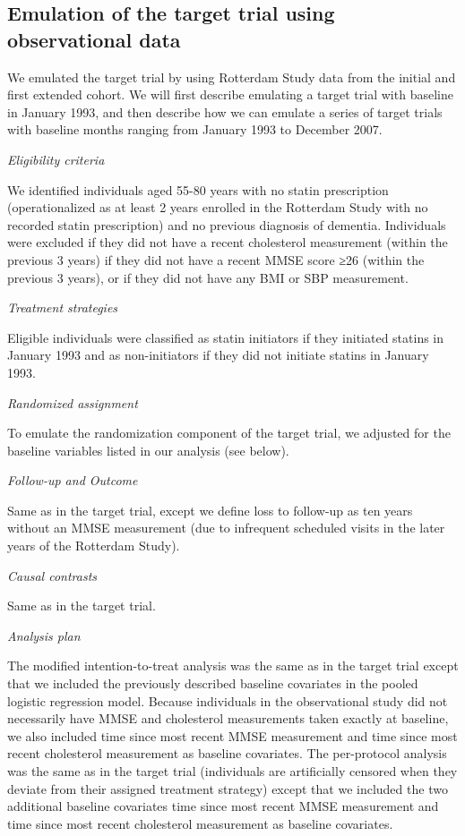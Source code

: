 \documentclass[
]{book}
\begin{document}
\hypertarget{emulation-of-the-target-trial-using-observational-data}{%
\subsection{Emulation of the target trial using observational data}\label{emulation-of-the-target-trial-using-observational-data}}

We emulated the target trial by using Rotterdam Study data from the initial and first extended cohort. We will first describe emulating a target trial with baseline in January 1993, and then describe how we can emulate a series of target trials with baseline months ranging from January 1993 to December 2007.

\emph{Eligibility criteria}

We identified individuals aged 55-80 years with no statin prescription (operationalized as at least 2 years enrolled in the Rotterdam Study with no recorded statin prescription) and no previous diagnosis of dementia. Individuals were excluded if they did not have a recent cholesterol measurement (within the previous 3 years) if they did not have a recent MMSE score ≥26 (within the previous 3 years), or if they did not have any BMI or SBP measurement.

\emph{Treatment strategies}

Eligible individuals were classified as statin initiators if they initiated statins in January 1993 and as non-initiators if they did not initiate statins in January 1993.

\emph{Randomized assignment}

To emulate the randomization component of the target trial, we adjusted for the baseline variables listed in our analysis (see below).

\emph{Follow-up and Outcome}

Same as in the target trial, except we define loss to follow-up as ten years without an MMSE measurement (due to infrequent scheduled visits in the later years of the Rotterdam Study).

\emph{Causal contrasts}

Same as in the target trial.

\emph{Analysis plan}

The modified intention-to-treat analysis was the same as in the target trial except that we included the previously described baseline covariates in the pooled logistic regression model. Because individuals in the observational study did not necessarily have MMSE and cholesterol measurements taken exactly at baseline, we also included time since most recent MMSE measurement and time since most recent cholesterol measurement as baseline covariates. The per-protocol analysis was the same as in the target trial (individuals are artificially censored when they deviate from their assigned treatment strategy) except that we included the two additional baseline covariates time since most recent MMSE measurement and time since most recent cholesterol measurement as baseline covariates.
\end{document}

